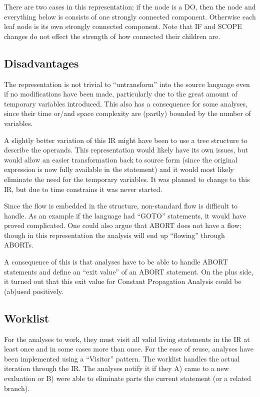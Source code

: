   There are two cases in this representation; if the node is a DO, then the node and
everything below is consists of one strongly connected component. Otherwise each leaf
node is its own strongly connected component. Note that IF and SCOPE changes do not
effect the strength of how connected their children are.

\subsection{Disadvantages}
The representation is not trivial to ``untransform'' into the source language even if no
modifications have been made, particularly due to the great amount of temporary variables
introduced. This also has a consequence for some analyses, since their time
or/and space complexity are (partly) bounded by the number of variables.

  A slightly better variation of this IR might have been to use a tree structure to
describe the operands. This representation would likely have its own issues, but would
allow an easier transformation back to source form (since the original expression is now
fully available in the statement) and it would most likely eliminate the need for the
temporary variables. It was planned to change to this IR, but due to time constrains
it was never started.

\docpar
Since the flow is embedded in the structure, non-standard flow is difficult to handle.
As an example if the language had  ``GOTO'' statements, it would have proved complicated.
One could also argue that ABORT does not have a flow; though in this representation the
analysis will end up ``flowing'' through ABORTs.

  A consequence of this is that analyses have to be able to handle ABORT statements and
define an ``exit value'' of an ABORT statement. On the plus side, it turned out that this
exit value for Constant Propagation Analysis could be (ab)used positively.

\subsection{Worklist}
For the analyses to work, they must visit all valid living statements in the IR
at least once and in some cases more than once. For the ease of reuse, analyses
have been implemented using a ``Visitor'' pattern. The worklist handles the
actual iteration through the IR. The analyses notify it if they A) came to
a new evaluation or B) were able to eliminate parts the current statement (or
a related branch).

